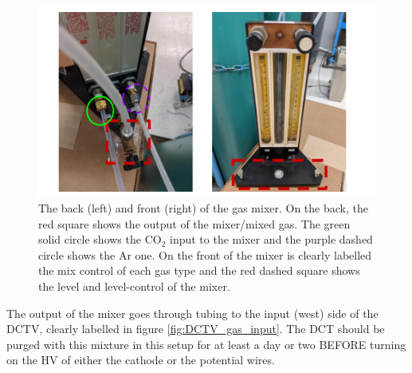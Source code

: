 \documentclass[12pt]{article}
\begin{document}
\begin{figure}
  \includegraphics[scale=0.5]{DCT_gas_mixer_example.png}
  \caption{The back (left) and front (right) of the gas mixer. On the back, the red square shows the output of the mixer/mixed gas. The green solid circle shows the CO$_{2}$ input to the mixer and the purple dashed circle shows the Ar one. On the front of the mixer is clearly labelled the mix control of each gas type and the red dashed square shows the level and level-control of the mixer.}
  \label{fig:mixer}
\end{figure} %

The output of the mixer goes through tubing to the input (west) side of the DCTV, clearly labelled in figure \ref{fig:DCTV_gas_input}. The DCT should be purged with this mixture in this setup for at least a day or two BEFORE turning on the HV of either the cathode or the potential wires. %
\end{document}
